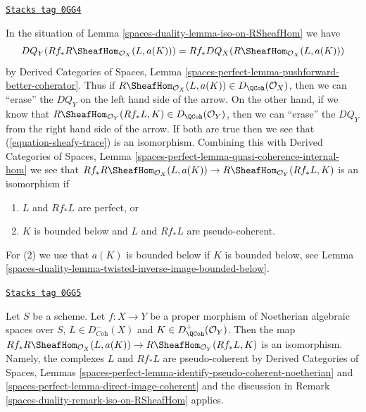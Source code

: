 \begin{remark}
\label{spaces-duality-remark-iso-on-RSheafHom}
\href{https://stacks.math.columbia.edu/tag/0GG4}{\texttt{Stacks tag 0GG4}}

In the situation of Lemma \ref{spaces-duality-lemma-iso-on-RSheafHom} we have
$$
DQ_Y(Rf_*R\SheafHom_{\mathcal{O}_X}(L, a(K))) =
Rf_* DQ_X(R\SheafHom_{\mathcal{O}_X}(L, a(K)))
$$
by Derived Categories of Spaces, Lemma
\ref{spaces-perfect-lemma-pushforward-better-coherator}.
Thus if $R\SheafHom_{\mathcal{O}_X}(L, a(K)) \in D_\QCoh(\mathcal{O}_X)$,
then we can ``erase'' the $DQ_Y$ on the left hand side of the arrow.
On the other hand, if we know that
$R\SheafHom_{\mathcal{O}_Y}(Rf_*L, K) \in D_\QCoh(\mathcal{O}_Y)$,
then we can ``erase'' the $DQ_Y$ from the right hand side of the arrow.
If both are true then we see that (\ref{equation-sheafy-trace})
is an isomorphism. Combining this with
Derived Categories of Spaces, Lemma
\ref{spaces-perfect-lemma-quasi-coherence-internal-hom}
we see that $Rf_*R\SheafHom_{\mathcal{O}_X}(L, a(K)) \to
R\SheafHom_{\mathcal{O}_Y}(Rf_*L, K)$ is an isomorphism if
\begin{enumerate}
\item $L$ and $Rf_*L$ are perfect, or
\item $K$ is bounded below and $L$ and $Rf_*L$ are pseudo-coherent.
\end{enumerate}
For (2) we use that $a(K)$ is bounded below if $K$
is bounded below, see Lemma \ref{spaces-duality-lemma-twisted-inverse-image-bounded-below}.
\end{remark}

\begin{example}
\label{spaces-duality-example-iso-on-RSheafHom-noetherian}
\href{https://stacks.math.columbia.edu/tag/0GG5}{\texttt{Stacks tag 0GG5}}

Let $S$ be a scheme.
Let $f : X \to Y$ be a proper morphism of Noetherian algebraic spaces
over $S$, $L \in D^-_{\textit{Coh}}(X)$ and $K \in D^+_{\QCoh}(\mathcal{O}_Y)$.
Then the map $Rf_*R\SheafHom_{\mathcal{O}_X}(L, a(K)) \to
R\SheafHom_{\mathcal{O}_Y}(Rf_*L, K)$ is an isomorphism.
Namely, the complexes $L$ and $Rf_*L$ are pseudo-coherent by
Derived Categories of Spaces, Lemmas
\ref{spaces-perfect-lemma-identify-pseudo-coherent-noetherian} and
\ref{spaces-perfect-lemma-direct-image-coherent}
and the discussion in Remark \ref{spaces-duality-remark-iso-on-RSheafHom} applies.
\end{example}

